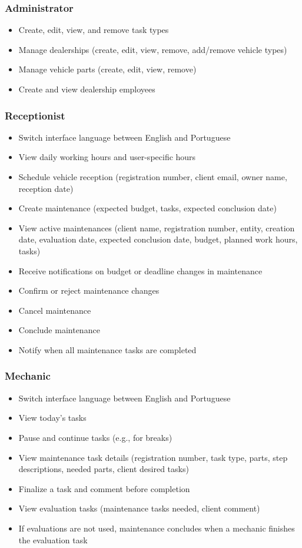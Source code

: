 \subsubsection{Administrator}
\begin{itemize}
    \item Create, edit, view, and remove task types
    \item Manage dealerships (create, edit, view, remove, add/remove vehicle types)
    \item Manage vehicle parts (create, edit, view, remove)
    \item Create and view dealership employees
\end{itemize}

\subsubsection{Receptionist}
\begin{itemize}
    \item Switch interface language between English and Portuguese
    \item View daily working hours and user-specific hours
    \item Schedule vehicle reception (registration number, client email, owner name, reception date)
    \item Create maintenance (expected budget, tasks, expected conclusion date)
    \item View active maintenances (client name, registration number, entity, creation date, evaluation date, expected conclusion date, budget, planned work hours, tasks)
    \item Receive notifications on budget or deadline changes in maintenance
    \item Confirm or reject maintenance changes
    \item Cancel maintenance
    \item Conclude maintenance
    \item Notify when all maintenance tasks are completed
\end{itemize}

\subsubsection{Mechanic}
\begin{itemize}
    \item Switch interface language between English and Portuguese
    \item View today’s tasks
    \item Pause and continue tasks (e.g., for breaks)
    \item View maintenance task details (registration number, task type, parts, step descriptions, needed parts, client desired tasks)
    \item Finalize a task and comment before completion
    \item View evaluation tasks (maintenance tasks needed, client comment)
    \item If evaluations are not used, maintenance concludes when a mechanic finishes the evaluation task
\end{itemize}

